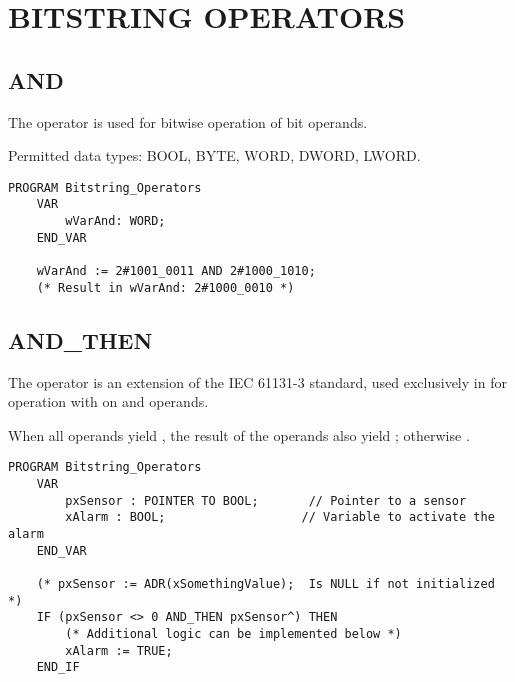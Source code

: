 \section{BITSTRING OPERATORS}

\subsection{AND} 


The operator is used for bitwise  operation of bit operands.

Permitted data types: BOOL, BYTE, WORD, DWORD, LWORD.

\begin{lstlisting}[language=ST ]
	PROGRAM Bitstring_Operators
	VAR 
		wVarAnd: WORD;
	END_VAR
	
	wVarAnd := 2#1001_0011 AND 2#1000_1010;
	(* Result in wVarAnd: 2#1000_0010 *)
\end{lstlisting}	  

\subsection{AND\_THEN}

The operator is an extension of the IEC 61131-3 standard, used
exclusively in  for  operation with 
on  and  operands.

When all operands yield , the result of the operands also yield ; otherwise .


\begin{lstlisting}[language=ST ]
	PROGRAM Bitstring_Operators
	VAR 
		pxSensor : POINTER TO BOOL;       // Pointer to a sensor 
		xAlarm : BOOL;                   // Variable to activate the alarm
	END_VAR
	
	(* pxSensor := ADR(xSomethingValue);  Is NULL if not initialized *)
	IF (pxSensor <> 0 AND_THEN pxSensor^) THEN 
		(* Additional logic can be implemented below *)
		xAlarm := TRUE;
	END_IF
\end{lstlisting} 

